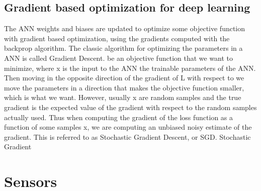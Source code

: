 \subsection{Gradient based optimization for deep learning}

The ANN weights and biases are updated to optimize some objective function
with gradient based optimization, using the gradients computed with the backprop algorithm.
The classic algorithm for optimizing the parameters in a ANN is called Gradient
Descent. be an objective function that we want to minimize, where
x is the input to the ANN the trainable parameters of the ANN. Then
moving in the opposite direction of the gradient of L with respect to  we move
the parameters in a direction that makes the objective function smaller, which is
what we want. However, usually x are random samples and the true gradient is
the expected value of the gradient with respect to the random samples actually
used. Thus when computing the gradient of the loss function as a function of
some samples x, we are computing an unbiased noisy estimate of the gradient.
This is referred to as Stochastic Gradient Descent, or SGD. Stochastic Gradient



\section{Sensors}

